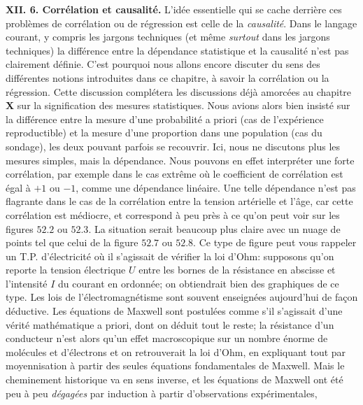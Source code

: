{\bf XII. 6. Corr\'elation et causalit\'e.} 
\medskip 
L'id\'ee essentielle qui se cache derri\`ere ces probl\`emes de 
corr\'elation ou de r\'egression est celle de la {\it causalit\'e}. 
Dans le langage courant, y compris les jargons techniques (et m\^eme
{\it surtout} dans les jargons techniques) la diff\'erence entre la 
d\'ependance statistique et la causalit\'e n'est pas clairement 
d\'efinie. C'est pourquoi nous allons encore discuter du sens des
diff\'erentes notions introduites dans ce chapitre, \`a savoir 
la corr\'elation ou la r\'egression. Cette discussion compl\'etera les 
discussions d\'ej\`a amorc\'ees au chapitre {\bf X}\hskip6pt sur la 
signification des mesures statistiques. Nous avions alors bien insist\'e 
sur la diff\'erence entre la mesure d'une probabilit\'e a priori (cas de 
l'exp\'erience reproductible) et la mesure d'une proportion dans une 
population (cas du sondage), les deux pouvant parfois se recouvrir. Ici, 
nous ne discutons plus les mesures simples, mais la d\'ependance. 
\medskip 
Nous pouvons en effet interpr\'eter une forte corr\'elation, par
exemple dans le cas extr\^eme o\`u le coefficient de corr\'elation est 
\'egal \`a $+1$ ou $-1$, comme une d\'ependance lin\'eaire. Une telle 
d\'ependance n'est pas flagrante dans le cas de la corr\'elation entre 
la tension art\'erielle et l'\^age, car cette corr\'elation est m\'ediocre, 
et correspond \`a peu pr\`es \`a ce qu'on peut voir sur les figures 
$52.2$ ou $52.3$. La situation serait beaucoup plus claire avec un nuage 
de points tel que celui de la figure $52.7$ ou $52.8$. Ce type de figure 
peut vous rappeler un T.P. d'\'electricit\'e o\`u il s'agissait de 
v\'erifier la loi d'Ohm: supposons qu'on reporte la tension \'electrique 
$U$ entre les bornes de la r\'esistance en abscisse et l'intensit\'e $I$ 
du courant en ordonn\'ee; on obtiendrait bien des graphiques de ce type. 
\medskip 
Les lois de l'\'electromagn\'etisme sont souvent enseign\'ees
aujourd'hui de fa\c{c}on d\'eductive. Les \'equations de Maxwell sont 
postul\'ees comme s'il s'agissait d'une v\'erit\'e math\'ematique a 
priori, dont on d\'eduit tout le reste; la r\'esistance d'un conducteur 
n'est alors qu'un effet macroscopique sur un nombre \'enorme de 
mol\'ecules et d'\'electrons et on retrouverait la loi d'Ohm, en 
expliquant {\og tout\fg} par moyennisation \`a partir des seules \'equations 
fondamentales de Maxwell.  Mais le cheminement historique va en sens 
inverse, et les \'equations de Maxwell ont \'et\'e peu \`a peu {\it 
d\'egag\'ees} par induction \`a partir d'observations exp\'erimentales, 
